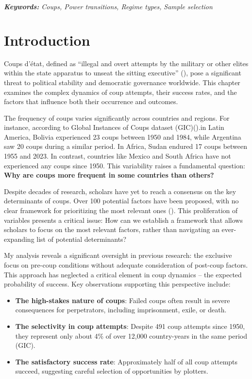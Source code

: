 \documentclass[
  12pt,
]{report}
\begin{document}
\emph{\textbf{Keywords:} Coups, Power transitions, Regime types,}
\emph{Sample selection}

\newpage

\section{Introduction}\label{introduction-1}

Coups d'état, defined as ``illegal and overt attempts by the military or
other elites within the state apparatus to unseat the sitting
executive'' (),
pose a significant threat to political stability and democratic
governance worldwide. This chapter examines the complex dynamics of coup
attempts, their success rates, and the factors that influence both their
occurrence and outcomes.

The frequency of coups varies significantly across countries and
regions. For instance, according to Global Instances of Coups dataset
(GIC)().in Latin
America, Bolivia experienced 23 coups between 1950 and 1984, while
Argentina saw 20 coups during a similar period. In Africa, Sudan endured
17 coups between 1955 and 2023. In contrast, countries like Mexico and
South Africa have not experienced any coups since 1950. This variability
raises a fundamental question: \textbf{Why are coups more frequent in
some countries than others?}

Despite decades of research, scholars have yet to reach a consensus on
the key determinants of coups. Over 100 potential factors have been
proposed, with no clear framework for prioritizing the most relevant
ones ().
This proliferation of variables presents a critical issue: How can we
establish a framework that allows scholars to focus on the most relevant
factors, rather than navigating an ever-expanding list of potential
determinants?

My analysis reveals a significant oversight in previous research: the
exclusive focus on pre-coup conditions without adequate consideration of
post-coup factors. This approach has neglected a critical element in
coup dynamics -- the expected probability of success. Key observations
supporting this perspective include:

\begin{itemize}
\item
  \textbf{The high-stakes nature of coups}: Failed coups often result in
  severe consequences for perpetrators, including imprisonment, exile,
  or death.
\item
  \textbf{The selectivity in coup attempts}: Despite 491 coup attempts
  since 1950, they represent only about 4\% of over 12,000 country-years
  in the same period (GIC).
\item
  \textbf{The satisfactory success rate}: Approximately half of all coup
  attempts succeed, suggesting careful selection of opportunities by
  plotters.
\end{itemize}
\end{document}
